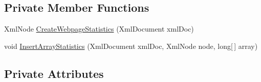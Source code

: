 \subsection*{Private Member Functions}
\begin{DoxyCompactItemize}
\item 
Xml\+Node \hyperlink{class_web_analyzer_1_1_models_1_1_data_model_1_1_webpage_model_af8b9bb060e28384f7ecf0635856187d4}{Create\+Webpage\+Statistics} (Xml\+Document xml\+Doc)
\item 
void \hyperlink{class_web_analyzer_1_1_models_1_1_data_model_1_1_webpage_model_a52e372578a17a8174ba376ca4d699b31}{Insert\+Array\+Statistics} (Xml\+Document xml\+Doc, Xml\+Node node, long\mbox{[}$\,$\mbox{]} array)
\end{DoxyCompactItemize}
\subsection*{Private Attributes}
